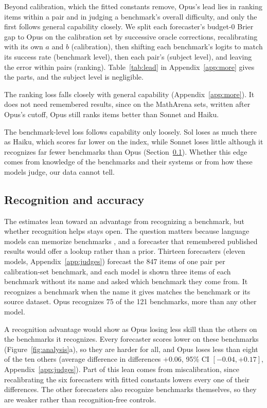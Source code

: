 \documentclass{article}
\begin{document}
Beyond calibration, which the fitted constants remove, Opus's lead lies in ranking items within a pair and in judging a benchmark's overall difficulty, and only the first follows general capability closely. We split each forecaster's budget-0 Brier gap to Opus on the calibration set by successive oracle corrections, recalibrating with its own $a$ and $b$ (calibration), then shifting each benchmark's logits to match its success rate (benchmark level), then each pair's (subject level), and leaving the error within pairs (ranking). Table~\ref{tab:lead} in Appendix~\ref{app:more} gives the parts, and the subject level is negligible.

The ranking loss falls closely with general capability (Appendix~\ref{app:more}). It does not need remembered results, since on the MathArena sets, written after Opus's cutoff, Opus still ranks items better than Sonnet and Haiku.

The benchmark-level loss follows capability only loosely. Sol loses as much there as Haiku, which scores far lower on the index, while Sonnet loses little although it recognizes far fewer benchmarks than Opus (Section~\ref{sec:memory}). Whether this edge comes from knowledge of the benchmarks and their systems or from how these models judge, our data cannot tell.

\subsection{Recognition and accuracy}
\label{sec:memory}

The estimates lean toward an advantage from recognizing a benchmark, but whether recognition helps stays open. The question matters because language models can memorize benchmarks \cite{oren2024contamination}, and a forecaster that remembered published results would offer a lookup rather than a prior. Thirteen forecasters (eleven models, Appendix~\ref{app:judges}) forecast the 847 items of one pair per calibration-set benchmark, and each model is shown three items of each benchmark without its name and asked which benchmark they come from. It recognizes a benchmark when the name it gives matches the benchmark or its source dataset. Opus recognizes 75 of the 121 benchmarks, more than any other model.

A recognition advantage would show as Opus losing less skill than the others on the benchmarks it recognizes. Every forecaster scores lower on these benchmarks (Figure~\ref{fig:analysis}a), so they are harder for all, and Opus loses less than eight of the ten others (average difference in differences $+0.06$, 95\% CI $[-0.04, +0.17]$, Appendix~\ref{app:judges}). Part of this lean comes from miscalibration, since recalibrating the six forecasters with fitted constants lowers every one of their differences. The other forecasters also recognize benchmarks themselves, so they are weaker rather than recognition-free controls.
\end{document}
